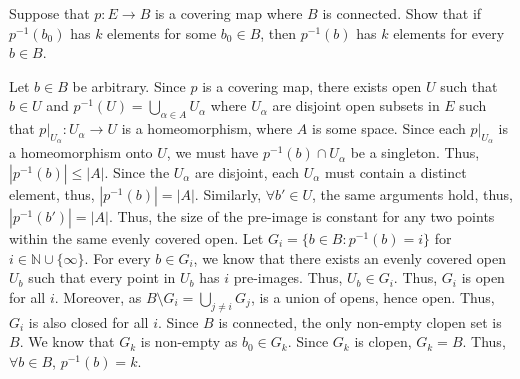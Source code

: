 \documentclass[12pt]{article}
\begin{document}
\begin{problab}{5}
Suppose that \( p : E \to B \) is a covering map where \( B \) is connected. Show that if \( p^{-1}(b_0) \) has \( k \) elements for some \( b_0 \in B \), then \( p^{-1}(b) \) has \( k \) elements for every \( b \in B \).
\end{problab}
\begin{solu}
    Let $b \in B$ be arbitrary. Since $p$ is a covering map, there exists open $U$ such that $b \in U$ and $p^{-1}(U) = \bigcup_{\alpha \in A} U_\alpha$ where $U_\alpha$ are disjoint open subsets in $E$ such that $p|_{U_\alpha}: U_\alpha \to U$ is a homeomorphism, where $A$ is some space. Since each $p|_{U_\alpha}$ is a homeomorphism onto $U$, we must have $p^{-1}(b) \cap U_\alpha$ be a singleton. Thus, $|p^{-1}(b)| \leq |A|$. Since the $U_\alpha$ are disjoint, each $U_\alpha$ must contain a distinct element, thus, $|p^{-1}(b)| = |A|$. Similarly, $\forall b' \in U$, the same arguments hold, thus, $|p^{-1}(b')| = |A|$. Thus, the size of the pre-image is constant for any two points within the same evenly covered open. \bbni
    Let $G_i = \{b \in B : p^{-1}(b) = i\}$ for $i \in \mathbb{N} \cup \{\infty\}$. For every $b \in G_i$, we know that there exists an evenly covered open $U_b$ such that every point in $U_b$ has $i$ pre-images. Thus, $U_b \in G_i$. Thus, $G_i$ is open for all $i$. Moreover, as $B \setminus G_i = \bigcup_{j \neq i} G_j$, is a union of opens, hence open. Thus, $G_i$ is also closed for all $i$. \bbni
    Since $B$ is connected, the only non-empty clopen set is $B$. We know that $G_k$ is non-empty as $b_0 \in G_k$. Since $G_k$ is clopen, $G_k = B$. Thus, $\forall b \in B$, $p^{-1}(b) = k$.
\end{solu}
\newpage
\end{document}
